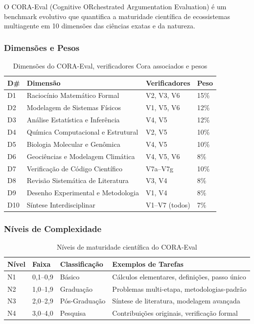 \documentclass[12pt,a4paper,oneside]{article}
\begin{document}
O CORA-Eval (Cognitive ORchestrated Argumentation Evaluation) é um benchmark
evolutivo que quantifica a maturidade científica de ecossistemas multiagente
em 10 dimensões das ciências exatas e da natureza.

\subsubsection{Dimensões e Pesos}

\begin{table}[H]
\centering
\caption{Dimensões do CORA-Eval, verificadores Cora associados e pesos}
\label{tab:dimensoes}
\begin{tabular}{p{}p{}p{}p{}}
\toprule
\textbf{D\#} & \textbf{Dimensão} & \textbf{Verificadores} & \textbf{Peso} \\
\midrule
D1 & Raciocínio Matemático Formal & V2, V3, V6 & 15\% \\
D2 & Modelagem de Sistemas Físicos & V1, V5, V6 & 12\% \\
D3 & Análise Estatística e Inferência & V4, V5 & 12\% \\
D4 & Química Computacional e Estrutural & V2, V5 & 10\% \\
D5 & Biologia Molecular e Genômica & V4, V5 & 10\% \\
D6 & Geociências e Modelagem Climática & V4, V5, V6 & 8\% \\
D7 & Verificação de Código Científico & V7a--V7g & 10\% \\
D8 & Revisão Sistemática de Literatura & V3, V4 & 8\% \\
D9 & Desenho Experimental e Metodologia & V1, V4 & 8\% \\
D10 & Síntese Interdisciplinar & V1--V7 (todos) & 7\% \\
\bottomrule
\end{tabular}
\end{table}

\subsubsection{Níveis de Complexidade}

\begin{table}[H]
\centering
\caption{Níveis de maturidade científica do CORA-Eval}
\label{tab:niveis}
\begin{tabular}{p{}p{}p{}p{}}
\toprule
\textbf{Nível} & \textbf{Faixa} & \textbf{Classificação} & \textbf{Exemplos de Tarefas} \\
\midrule
N1 & 0,1--0,9 & Básico & Cálculos elementares, definições, passo único \\
N2 & 1,0--1,9 & Graduação & Problemas multi-etapa, metodologias-padrão \\
N3 & 2,0--2,9 & Pós-Graduação & Síntese de literatura, modelagem avançada \\
N4 & 3,0--4,0 & Pesquisa & Contribuições originais, verificação formal \\
\bottomrule
\end{tabular}
\end{table}
\end{document}
